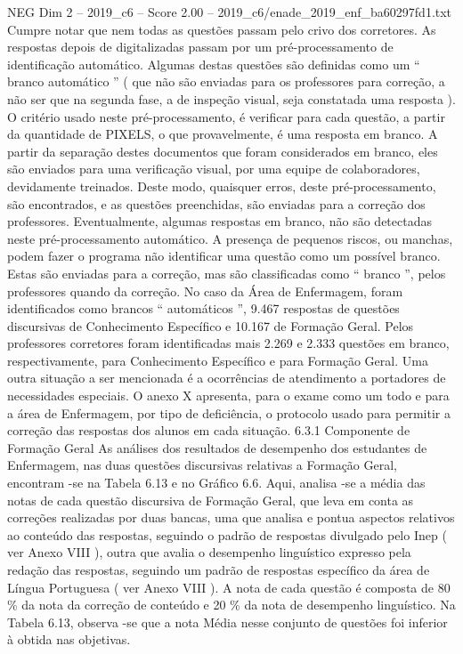 \begin{textsample}{NEG Dim 2 – 2019\_c6 – Score 2.00 – 2019\_c6/enade\_2019\_enf\_ba60297fd1.txt}
Cumpre notar que nem todas as questões passam pelo crivo dos corretores.
As respostas depois de digitalizadas passam por um pré-processamento de identificação automático.
Algumas destas questões são definidas como um “ branco automático ” ( que não são enviadas para os professores para correção, a não ser que na segunda fase, a de inspeção visual, seja constatada uma resposta ).
O critério usado neste pré-processamento, é verificar para cada questão, a partir da quantidade de PIXELS, o que provavelmente, é uma resposta em branco.
A partir da separação destes documentos que foram considerados em branco, eles são enviados para uma verificação visual, por uma equipe de colaboradores, devidamente treinados.
Deste modo, quaisquer erros, deste pré-processamento, são encontrados, e as questões preenchidas, são enviadas para a correção dos professores.
Eventualmente, algumas respostas em branco, não são detectadas neste pré-processamento automático.
A presença de pequenos riscos, ou manchas, podem fazer o programa não identificar uma questão como um possível branco.
Estas são enviadas para a correção, mas são classificadas como “ branco ”, pelos professores quando da correção.
No caso da Área de Enfermagem, foram identificados como brancos “ automáticos ”, 9.467 respostas de questões discursivas de Conhecimento Específico e 10.167 de Formação Geral.
Pelos professores corretores foram identificadas mais 2.269 e 2.333 questões em branco, respectivamente, para Conhecimento Específico e para Formação Geral.
Uma outra situação a ser mencionada é a ocorrências de atendimento a portadores de necessidades especiais.
O anexo X apresenta, para o exame como um todo e para a área de Enfermagem, por tipo de deficiência, o protocolo usado para permitir a correção das respostas dos alunos em cada situação. 6.3.1 Componente de Formação Geral As análises dos resultados de desempenho dos estudantes de Enfermagem, nas duas questões discursivas relativas a Formação Geral, encontram -se na Tabela 6.13 e no Gráfico 6.6.
Aqui, analisa -se a média das notas de cada questão discursiva de Formação Geral, que leva em conta as correções realizadas por duas bancas, uma que analisa e pontua aspectos relativos ao conteúdo das respostas, seguindo o padrão de respostas divulgado pelo Inep ( ver Anexo VIII ), outra que avalia o desempenho linguístico expresso pela redação das respostas, seguindo um padrão de respostas específico da área de Língua Portuguesa ( ver Anexo VIII ).
A nota de cada questão é composta de 80 \% da nota da correção de conteúdo e 20 \% da nota de desempenho linguístico.
Na Tabela 6.13, observa -se que a nota Média nesse conjunto de questões foi inferior à obtida nas objetivas.

\end{textsample}
